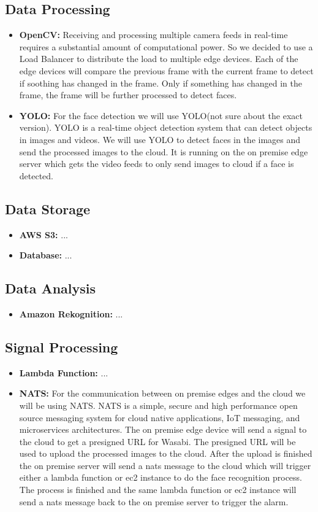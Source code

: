 \documentclass[conference]{IEEEtran}
\begin{document}
\subsection{Data Processing}
\begin{itemize}
    \item \textbf{OpenCV:} Receiving and processing multiple camera feeds in real-time requires a substantial amount of computational power.
          So we decided to use a Load Balancer to distribute the load to multiple edge devices.
          Each of the edge devices will compare the previous frame with the current frame to detect if soothing has changed in the frame.
          Only if something has changed in the frame, the frame will be further processed to detect faces.
    \item \textbf{YOLO:} For the face detection we will use YOLO(not sure about the exact version). YOLO is a real-time object detection system that can detect objects in images and videos.
          We will use YOLO to detect faces in the images and send the processed images to the cloud. It is running on the on premise edge server which gets the video feeds to only
          send images to cloud if a face is detected.
\end{itemize}
\subsection{Data Storage}
\begin{itemize}
    \item \textbf{AWS S3:} ...
    \item \textbf{Database:} ...
\end{itemize}
\subsection{Data Analysis}
\begin{itemize}
    \item \textbf{Amazon Rekognition:} ...
\end{itemize}
\subsection{Signal Processing}
\begin{itemize}
    \item \textbf{Lambda Function:} ...
    \item \textbf{NATS:} For the communication between on premise edges and the cloud we will be using NATS. NATS is a simple, secure and high performance open source messaging system for cloud native applications, IoT messaging, and microservices architectures.
          The on premise edge device will send a signal to the cloud to get a presigned URL for Wasabi. The presigned URL will be used to upload the processed images to the cloud.
          After the upload is finished the on premise server will send a nats message to the cloud which will trigger either a lambda function or ec2 instance to do the face recognition process. 
          The process is finished and the same lambda function or ec2 instance will send a nats message back to the on premise server to trigger the alarm.
\end{itemize}
\end{document}
